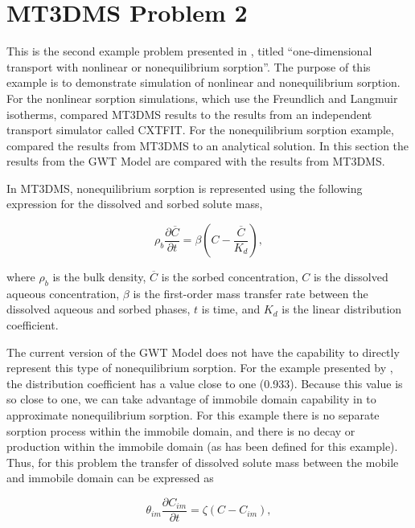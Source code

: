 \section{MT3DMS Problem 2}

This is the second example problem presented in \cite{zheng1999mt3dms}, titled ``one-dimensional transport with nonlinear or nonequilibrium sorption''.  The purpose of this example is to demonstrate simulation of nonlinear and nonequilibrium sorption.   For the nonlinear sorption simulations, which use the Freundlich and Langmuir isotherms, \cite{zheng1999mt3dms} compared MT3DMS results to the results from an independent transport simulator called CXTFIT.  For the nonequilibrium sorption example, \cite{zheng1999mt3dms} compared the results from MT3DMS to an analytical solution.  In this section the results from the \mf GWT Model are compared with the results from MT3DMS.

In MT3DMS, nonequilibrium sorption is represented using the following expression for the dissolved and sorbed solute mass,

\begin{equation}
	\rho_b \frac{\partial \overline{C}}{\partial t} = \beta \left ( C - \frac{\overline{C}}{K_d} \right ),
	\label{eq:nonequilbrium}
\end{equation}

\noindent where $\rho_b$ is the bulk density, $\overline{C}$ is the sorbed concentration, $C$ is the dissolved aqueous concentration, $\beta$ is the first-order mass transfer rate between the dissolved aqueous and sorbed phases, $t$ is time, and $K_d$ is the linear distribution coefficient.  

The current version of the \mf GWT Model does not have the capability to directly represent this type of nonequilibrium sorption.  For the example presented by \cite{zheng1999mt3dms}, the distribution coefficient has a value close to one (0.933). Because this value is so close to one, we can take advantage of immobile domain capability in \mf to approximate nonequilibrium sorption.  For this example there is no separate sorption process within the immobile domain, and there is no decay or production within the immobile domain (as has been defined for this example).  Thus, for this problem the transfer of dissolved solute mass between the mobile and immobile domain can be expressed as

\begin{equation}
	\theta_{im} \frac{\partial C_{im}}{\partial t} = \zeta \left ( C - C_{im} \right ),
	\label{eq:nonequilbrium}
\end{equation}

